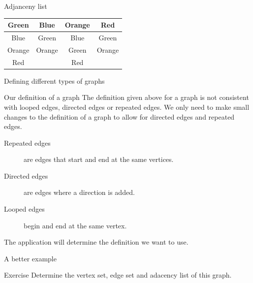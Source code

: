 \begin{frame}{Adjanceny list}
	\begin{center}
	\begin{tabular}{c@{\hskip 0.5cm}c@{\hskip 0.5cm}c@{\hskip 0.5cm}c}
	Green & Blue & Orange & Red \\
  \midrule
	Blue & Green & Blue & Green \\
	Orange & Orange & Green & Orange \\
	Red & & Red & \\
	\end{tabular}
	\end{center}
\end{frame}

\begin{frame}{Defining different types of graphs}
	
	\begin{block}{Our definition of a graph}
	The definition given above for a graph is not consistent with looped edges, directed edges or repeated edges. We only need to make small changes to the definition of a graph to allow for directed edges and repeated edges.
	\end{block}
	
	\begin{description}
		\item[Repeated edges] are edges that start and end at the same vertices.
		\item[Directed edges] are edges where a direction is added.
		\item[Looped edges] begin and end at the same vertex.
	\end{description}
	
	The application will determine the definition we want to use.
\end{frame}


\begin{frame}{A better example}
  \begin{adjustbox}{max width={0.9\textwidth},center} 
  \end{adjustbox}
  \vspace{0.1cm}
  \begin{block}{Exercise}
	Determine the vertex set, edge set and adacency list of this graph.
  \end{block}
  
\end{frame}


